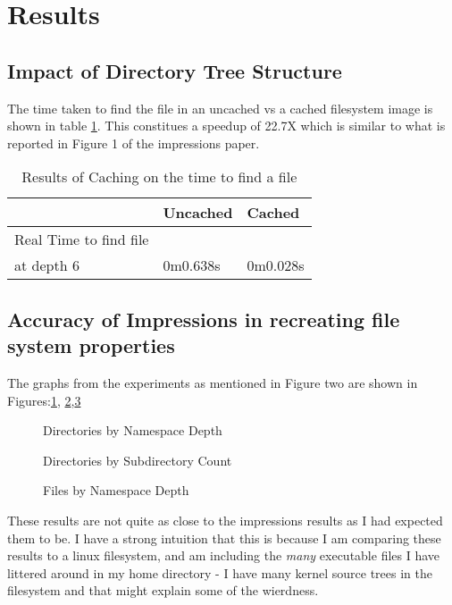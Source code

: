 \section{Results}
\subsection{Impact of Directory Tree Structure}

The time taken to find the file in an uncached vs a cached filesystem image is shown in table \ref{Tab:tab1}. This constitues a speedup of 22.7X which is similar to what is reported in Figure 1 of the impressions paper. 

\begin{table}[ht]
    \caption{Results of Caching on the time to find a file}
    \begin{tabular}{|l|l|l|}
    \hline
     & Uncached & Cached \\ \hline
    Real Time to find file \\at depth 6 & 0m0.638s & 0m0.028s \\ \hline
    \end{tabular}
    \label{Tab:tab1}
    \end{table}

\subsection{Accuracy of Impressions in recreating file system properties}

The graphs from the experiments as mentioned in Figure two are shown in Figures:\ref{fig:a}, \ref{fig:b},\ref{fig:f}

\begin{figure}[htb]
	  \caption{\label{fig:a} Directories by Namespace Depth}
    \end{figure}

\begin{figure}[htb]
          \caption{\label{fig:b} Directories by Subdirectory Count}
        \end{figure}

\begin{figure}[htb]
              \caption{\label{fig:f} Files by Namespace Depth}
            \end{figure}

These results are not quite as close to the impressions results as I had expected them to be. I have a strong intuition that this is because I am comparing these results to a linux filesystem, and am including the \emph{many} executable files I have littered around in my home directory - I have many kernel source trees in the filesystem and that might explain some of the wierdness.